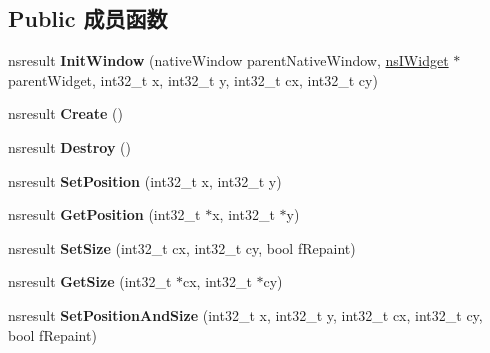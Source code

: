 \subsection*{Public 成员函数}
\begin{DoxyCompactItemize}
\item 
\mbox{\label{interfacens_i_base_window_a3c3c4b26a9cab00d35228b00c8fcd0ba}} 
nsresult {\bfseries Init\+Window} (native\+Window parent\+Native\+Window, \hyperlink{interfacens_i_supports}{ns\+I\+Widget} $\ast$parent\+Widget, int32\+\_\+t x, int32\+\_\+t y, int32\+\_\+t cx, int32\+\_\+t cy)
\item 
\mbox{\label{interfacens_i_base_window_a65cb17fce6c90fc2ad8fa3211d524658}} 
nsresult {\bfseries Create} ()
\item 
\mbox{\label{interfacens_i_base_window_a8ad145a51f575345b3261ceb30b38da0}} 
nsresult {\bfseries Destroy} ()
\item 
\mbox{\label{interfacens_i_base_window_a64c19de0fe74ac1f834e0c8a4dd39c03}} 
nsresult {\bfseries Set\+Position} (int32\+\_\+t x, int32\+\_\+t y)
\item 
\mbox{\label{interfacens_i_base_window_a70a2e583d395dee288129d7897d15e5f}} 
nsresult {\bfseries Get\+Position} (int32\+\_\+t $\ast$x, int32\+\_\+t $\ast$y)
\item 
\mbox{\label{interfacens_i_base_window_a5995e4dbe541e5a59075c2680c6b6bf6}} 
nsresult {\bfseries Set\+Size} (int32\+\_\+t cx, int32\+\_\+t cy, bool f\+Repaint)
\item 
\mbox{\label{interfacens_i_base_window_a9ac0c6cf75538d0d676f815d0b17c09f}} 
nsresult {\bfseries Get\+Size} (int32\+\_\+t $\ast$cx, int32\+\_\+t $\ast$cy)
\item 
\mbox{\label{interfacens_i_base_window_a0a143ebc06f055e7bdea2d4a8bcdebb5}} 
nsresult {\bfseries Set\+Position\+And\+Size} (int32\+\_\+t x, int32\+\_\+t y, int32\+\_\+t cx, int32\+\_\+t cy, bool f\+Repaint)
\item 
\mbox{\label{interfacens_i_base_window_a265b88644983285ccfdb8af42420d380}} 

\end{DoxyCompactItemize}
